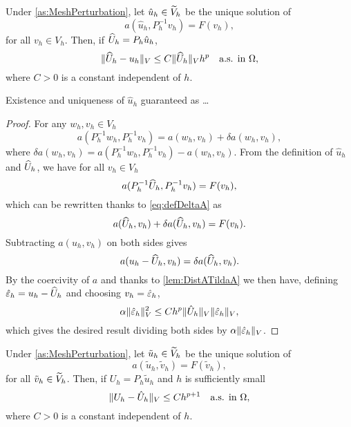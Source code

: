 \documentclass[10pt]{article}
\begin{document}
\begin{lemma}\label{lem:uHatU} Under \cref{as:MeshPerturbation}, let $\hat u_h \in \widetilde V_h$ be the unique solution of
\begin{equation}
	a(\hat u_h, P_h^{-1}v_h) = F(v_h), 
\end{equation}
for all $v_h \in V_h$. Then, if $\widehat U_h = P_h \hat u_h$,
\begin{equation}
	\lVert\widehat U_h - u_h\rVert_V \leq C \lVert\widehat U_h\rVert_V h^p \quad \text{a.s. in } \Omega,
\end{equation} 
where $C > 0$ is a constant independent of $h$.
\end{lemma}
\begin{remark} Existence and uniqueness of $\hat u_h$ guaranteed as \dots
\end{remark}
\begin{proof}
For any $w_h, v_h \in V_h$ 
\begin{equation}\label{eq:defDeltaA}
	a(P_h^{-1} w_h, P_h^{-1} v_h) = a(w_h, v_h) + \delta a(w_h, v_h),
\end{equation}
where $\delta a(w_h, v_h) = a(P_h^{-1} w_h, P_h^{-1} v_h) - a(w_h, v_h)$. From the definition of $\hat u_h$ and $\widehat U_h$, we have for all $v_h \in V_h$
\begin{equation}
	a(P_h^{-1}\widehat U_h, P_h^{-1} v_h) = F(v_h),
\end{equation}
which can be rewritten thanks to \eqref{eq:defDeltaA} as
\begin{equation}
	a(\widehat U_h, v_h) + \delta a(\widehat U_h, v_h) = F(v_h).
\end{equation}
Subtracting $a(u_h, v_h)$ on both sides gives
\begin{equation}
	a(u_h - \widehat U_h, v_h) = \delta a(\widehat U_h, v_h).
\end{equation}
By the coercivity of $a$ and thanks to \cref{lem:DistATildaA} we then have, defining $\hat {\varepsilon}_h = u_h - \widehat U_h$ and choosing $v_h = \hat {\varepsilon}_h$,
\begin{equation}
	\alpha \lVert\hat {\varepsilon}_h\rVert_V^2 \leq Ch^p \lVert\hat U_h\rVert_V \lVert\hat {\varepsilon}_h\rVert_V,
\end{equation}
which gives the desired result dividing both sides by $\alpha \lVert\hat {\varepsilon}_h\rVert_V$.
\end{proof}
\begin{lemma}\label{lem:tildeUhatU} Under \cref{as:MeshPerturbation}, let $\tilde u_h \in \widetilde V_h$ be the unique solution of
	\begin{equation}
		a(\tilde u_h, \tilde v_h) = F(\tilde v_h), 
	\end{equation}
	for all $\tilde v_h \in \widetilde V_h$. Then, if $U_h = P_h \tilde u_h$ and $h$ is sufficiently small
	\begin{equation}
		\lVert U_h - \hat U_h\rVert_V \leq C h^{p+1} \quad \text{a.s. in } \Omega,
	\end{equation} 
	where $C > 0$ is a constant independent of $h$.
\end{lemma}
\end{document}
